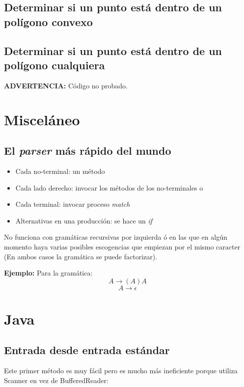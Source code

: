\documentclass[10pt,letterpaper]{article}
\begin{document}
\subsection{Determinar si un punto está dentro de un polígono convexo}

\subsection{Determinar si un punto está dentro de un polígono cualquiera}
\large{\textbf{ADVERTENCIA:}} Código no probado.

\section{Misceláneo}
\subsection{El \textit{parser} más rápido del mundo}
\begin{itemize}
\item Cada no-terminal: un método
\item Cada lado derecho: invocar los métodos de los no-terminales o
\item Cada terminal: invocar proceso \textit{match}
\item Alternativas en una producción: se hace un \textit{if}
\end{itemize}
\medskip
No funciona con gramáticas recursivas por izquierda ó en las que en algún momento haya
varias posibles escogencias que empiezan por el mismo caracter (En ambos casos la gramática se puede factorizar).

\medskip
\textbf{Ejemplo:} Para la gramática:
$$
A \longrightarrow (A)A 
$$ $$
A \longrightarrow \epsilon
$$



\section{Java}
\subsection{Entrada desde entrada estándar}
Este primer método es muy fácil pero es mucho más ineficiente porque utiliza Scanner en vez de BufferedReader: \\
\end{document}
